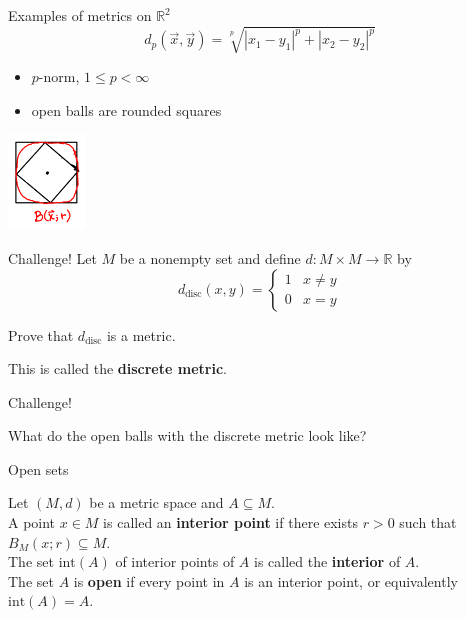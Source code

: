 \documentclass{beamer}
\begin{document}
\begin{frame}{Examples of metrics on $\mathbb{R}^2$}
$$d_p(\vec x,\vec y) = \sqrt[p]{|x_1-y_1|^p + |x_2-y_2|^p}$$
\begin{itemize}
\pause
\item $p$-norm, $1\leq p < \infty$
\pause
\item open balls are rounded squares
\end{itemize}
\pause
\begin{center}
\includegraphics[height=1in]{fig/ballp.png}
\end{center}
\end{frame}

\begin{frame}{Challenge!}
Let $M$ be a nonempty set and define $d: M\times M\rightarrow \mathbb{R}$ by
$$d_{\text{disc}}(x,y) = \left\lbrace\begin{array}{cc}
1 &  x\neq y\\
0 &  x = y
\end{array}\right.$$
\pause
\begin{prob}
Prove that $d_{\text{disc}}$ is a metric.
\end{prob}
\pause
This is called the \textbf{discrete metric}.
\end{frame}

\begin{frame}{Challenge!}
\begin{prob}
What do the open balls with the discrete metric look like?
\end{prob}
\end{frame}

\begin{frame}{Open sets}
\begin{defn}
\pause
Let $(M,d)$ be a metric space and $A\subseteq M$.\\
\pause
A point $x\in M$ is called an \textbf{interior point} if there exists $r>0$ such that $B_M(x;r)\subseteq M$.\\
\pause
The set $\text{int}(A)$ of interior points of $A$ is called the \textbf{interior} of $A$.\\
\pause
The set $A$ is \textbf{open} if every point in $A$ is an interior point, or equivalently $\text{int}(A) = A$.
\end{defn}
\end{frame}
\end{document}
